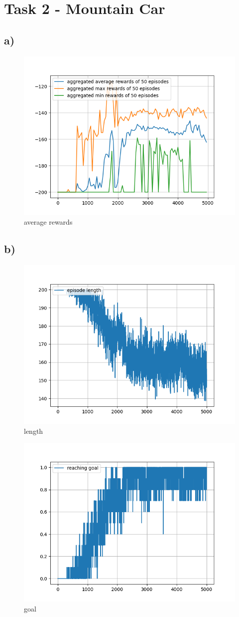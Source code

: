\documentclass[a4paper]{article}
\begin{document}
\section*{Task 2 - Mountain Car}

\subsection*{a)}

\begin{figure}[!ht]
	\centering
	\includegraphics[width=0.7\linewidth]{reward}
	\caption{average rewards}
	\label{fig:reward}
\end{figure}


\subsection*{b)}
\begin{figure}[!ht]
	\centering
	\includegraphics[width=0.7\linewidth]{length}
	\caption{length}
	\label{fig:length}
\end{figure}
\begin{figure}[!ht]
	\centering
	\includegraphics[width=0.7\linewidth]{goal}
	\caption{goal}
	\label{fig:goal}
\end{figure}
\end{document}
